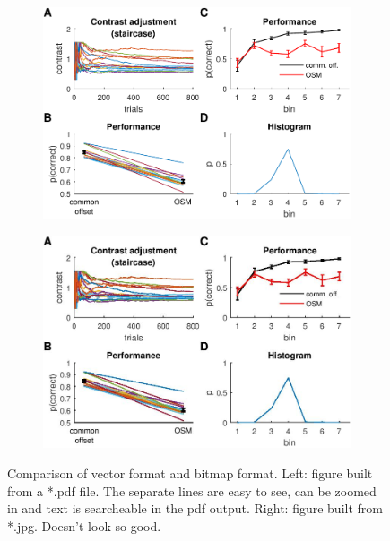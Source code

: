 \begin{figure}[t]
	\centering
	
	\begin{subfigure}[t]{0.45\textwidth}
		\centering
		\includegraphics[width=\linewidth]{Figures/Resultspdf} 
	\end{subfigure}		
	\hfill %
	\begin{subfigure}[t]{0.45\textwidth}
		\centering
		\includegraphics[width=\linewidth]{Figures/Resultsjpg} 
	\end{subfigure}
	
	
	\caption{Comparison of vector format and bitmap format. Left: figure built from a *.pdf file. The separate lines are easy to see, can be zoomed in and text is searcheable in the pdf output. Right: figure built from *.jpg. Doesn't look so good.}
	\label{pdf_vs_jpg}
\end{figure}

